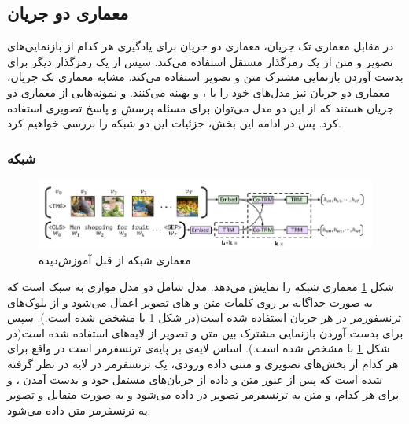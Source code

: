 \subsection[معماری دو جریان]{معماری دو جریان}
در مقابل معماری تک جریان، معماری‌ دو جریان برای یادگیری  هر کدام از بازنمایی‌های تصویر و متن از یک رمزگذار مستقل استفاده می‌کند. سپس از یک رمزگذار دیگر برای بدست آوردن بازنمایی مشترک متن و تصویر استفاده می‌کند. مشابه معماری تک جریان، معماری‌ دو جریان نیز مدل‌های خود را با
	،
	و 
	بهینه می‌کنند. 
	\cite{lu2019vilbert}
	 و
	\cite{tan2019lxmert}
  نمونه‌هایی از معماری دو جریان هستند که از این دو مدل می‌توان برای مسئله پرسش و پاسخ تصویری استفاده کرد. پس در ادامه این بخش، جزئیات این دو شبکه را بررسی خواهیم کرد.
 
\subsubsection{  شبکه }
	\begin{figure}
	 	\centerline{\includegraphics[scale=0.6]{images/VilBERT.JPG}}
	 	\caption[معماری شبکه از قبل آموزش‌دیده]{معماری شبکه از قبل آموزش‌دیده\cite{lu2019vilbert}}
	 	\label{fig:ViLBERT}
	\end{figure}
	
	شکل
	\ref{fig:ViLBERT}
	معماری شبکه 
	را نمایش می‌دهد. مدل 
	شامل دو مدل موازی به سبک
	است که به صورت جداگانه بر روی کلمات متن و 
	های تصویر اعمال می‌شود و از بلوک‌های ترنسفورمر در هر جریان استفاده شده است(در شکل 
	\ref{fig:ViLBERT}
	با 
	مشخص شده است.). سپس برای بدست آوردن بازنمایی مشترک بین متن و تصویر از لایه‌های 
	استفاده شده است(در شکل 
	\ref{fig:ViLBERT}
	با 
	مشخص شده است.). اساس لایه‌ی 
    بر پایه‌ی ترنسفرمر است در واقع برای هر کدام از بخش‌های تصویری و متنی داده ورودی، یک ترنسفرمر در لایه 
    در نظر گرفته شده است که پس از عبور متن و داده از جریان‌های مستقل خود و بدست آمدن 
	،
	و
	برای هر کدام، 
	و
	متن به ترنسفرمر تصویر در 
	داده می‌شود و به صورت متقابل
	و
	تصویر به ترنسفرمر متن داده می‌شود. 
	
